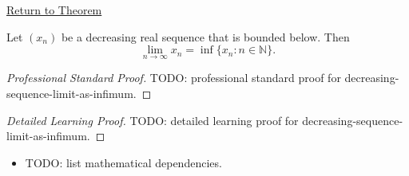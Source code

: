 \newpage
{}
\label{prf:decreasing-sequence-limit-as-infimum}

\begin{remark*}[Return]
\hyperref[thm:decreasing-sequence-limit-as-infimum]{Return to Theorem}
\end{remark*}

\begin{theorem*}
Let $(x_n)$ be a decreasing real sequence that is bounded below. Then
\[
  \lim_{n\to\infty}x_n=\inf\{x_n:n\in\mathbb{N}\}.
\]

\smallskip
\noindent
\end{theorem*}

\begin{proof}[Professional Standard Proof]
\LRAProofBodyStart
TODO: professional standard proof for decreasing-sequence-limit-as-infimum.
\end{proof}

\begin{proof}[Detailed Learning Proof]
\LRAProofBodyStart
TODO: detailed learning proof for decreasing-sequence-limit-as-infimum.
\end{proof}

\begin{remark*}
\end{remark*}

\begin{dependencies}
\begin{itemize}
  \item TODO: list mathematical dependencies.
\end{itemize}
\end{dependencies}

\clearpage
